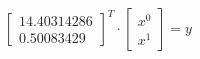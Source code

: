 \documentclass{article}
\begin{document}
    \[
    \begin{bmatrix}
        14.40314286 \\
        0.50083429
    \end{bmatrix}^T
    \cdot
    \begin{bmatrix}
        x^0 \\
        x^1
    \end{bmatrix}
    =
    y
    \]
\end{document}
